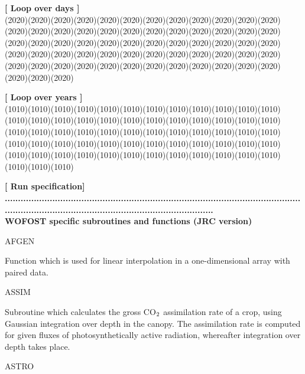 \documentclass[11pt]{article}
\begin{document}
\strut\hfill {\bf [ Loop over days ]}\\
 \GrBox(2020)\GrBox(2020)\GrBox(2020)\GrBox(2020)\GrBox(2020)\GrBox(2020)\GrBox(2020)\GrBox(2020)\GrBox(2020)\GrBox(2020)\GrBox(2020)\GrBox(2020)\GrBox(2020)\GrBox(2020)\GrBox(2020)\GrBox(2020)\GrBox(2020)\GrBox(2020)\GrBox(2020)\GrBox(2020)\GrBox(2020)\GrBox(2020)\GrBox(2020)\GrBox(2020)\GrBox(2020)\GrBox(2020)\GrBox(2020)\GrBox(2020)\GrBox(2020)\GrBox(2020)\GrBox(2020)\GrBox(2020)\GrBox(2020)\GrBox(2020)\GrBox(2020)\GrBox(2020)\GrBox(2020)\GrBox(2020)\GrBox(2020)\GrBox(2020)\GrBox(2020)\GrBox(2020)\GrBox(2020)\GrBox(2020)\GrBox(2020)\GrBox(2020)\GrBox(2020)\GrBox(2020)\GrBox(2020)\GrBox(2020)\GrBox(2020)\GrBox(2020)\GrBox(2020)\GrBox(2020)\GrBox(2020)\GrBox(2020)\GrBox(2020)\GrBox(2020)\GrBox(2020)\GrBox(2020)\GrBox(2020)\GrBox(2020)\GrBox(2020)\\
\strut\hfill {\bf [ Loop over years ]}\\
 \GrBox(1010)\GrBox(1010)\GrBox(1010)\GrBox(1010)\GrBox(1010)\GrBox(1010)\GrBox(1010)\GrBox(1010)\GrBox(1010)\GrBox(1010)\GrBox(1010)\GrBox(1010)\GrBox(1010)\GrBox(1010)\GrBox(1010)\GrBox(1010)\GrBox(1010)\GrBox(1010)\GrBox(1010)\GrBox(1010)\GrBox(1010)\GrBox(1010)\GrBox(1010)\GrBox(1010)\GrBox(1010)\GrBox(1010)\GrBox(1010)\GrBox(1010)\GrBox(1010)\GrBox(1010)\GrBox(1010)\GrBox(1010)\GrBox(1010)\GrBox(1010)\GrBox(1010)\GrBox(1010)\GrBox(1010)\GrBox(1010)\GrBox(1010)\GrBox(1010)\GrBox(1010)\GrBox(1010)\GrBox(1010)\GrBox(1010)\GrBox(1010)\GrBox(1010)\GrBox(1010)\GrBox(1010)\GrBox(1010)\GrBox(1010)\GrBox(1010)\GrBox(1010)\GrBox(1010)\GrBox(1010)\GrBox(1010)\GrBox(1010)\GrBox(1010)\GrBox(1010)\GrBox(1010)\GrBox(1010)\GrBox(1010)\GrBox(1010)\GrBox(1010)\\
\strut\hfill {\bf [ Run specification]}\\
{\bf ...............................................................................................................................................................................................\-}\\
 {\bf {\large WOFOST specific subroutines and functions (JRC version)}}

AFGEN
\testlastline

\begin{indenting}{5.08cm}
Function which is used for linear interpola\-tion in a one-di\-mensi\-onal array with paired data.
\end{indenting}
ASSIM
\testlastline

\begin{indenting}{5.08cm}
Subroutine which calculates the gross CO$_{{\rm 2}}$ assimilation rate
of a crop, using Gaussian integration over depth in the
canopy. The assimilation rate is computed for given fluxes of
photosyntheti\-cally active radiation, whereafter integration
over depth takes place.
\end{indenting}
ASTRO
\testlastline
\end{document}
